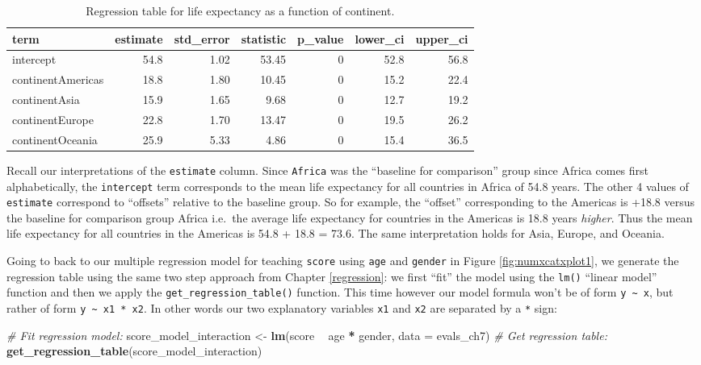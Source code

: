 \documentclass[12pt, krantz2,]{krantz}
\makeatletter
\newenvironment{Shaded}{\begin{snugshade}}{\end{snugshade}}
\newcommand{\CommentTok}[1]{\textcolor[rgb]{0.37,0.37,0.37}{\textit{#1}}}
\newcommand{\DataTypeTok}[1]{\textcolor[rgb]{0.27,0.27,0.27}{#1}}
\newcommand{\KeywordTok}[1]{\textcolor[rgb]{0.27,0.27,0.27}{\textbf{#1}}}
\newcommand{\NormalTok}[1]{#1}
\newcommand{\OperatorTok}[1]{\textcolor[rgb]{0.43,0.43,0.43}{\textbf{#1}}}
\newcommand{\StringTok}[1]{\textcolor[rgb]{0.5,0.5,0.5}{#1}}
\newenvironment{kframe}{%
\medskip{}
\setlength{\fboxsep}{.8em}
 \def\at@end@of@kframe{}%
 \ifinner\ifhmode%
  \def\at@end@of@kframe{\end{minipage}}%
  \begin{minipage}{\columnwidth}%
 \fi\fi%
 \def\FrameCommand##1{\hskip\@totalleftmargin \hskip-\fboxsep
 \colorbox{shadecolor}{##1}\hskip-\fboxsep
     \hskip-\linewidth \hskip-\@totalleftmargin \hskip\columnwidth}%
 \MakeFramed {\advance\hsize-\width
   \@totalleftmargin\z@ \linewidth\hsize
   \@setminipage}}%
 {\par\unskip\endMakeFramed%
 \at@end@of@kframe}
\renewenvironment{Shaded}{\begin{kframe}}{\end{kframe}}
\makeatother
\begin{document}
\begin{table}[H]

\caption{\label{tab:unnamed-chunk-202}Regression table for life expectancy as a function of continent.}
\centering
\fontsize{10}{12}\selectfont
\begin{tabular}{lrrrrrr}
\toprule
term & estimate & std\_error & statistic & p\_value & lower\_ci & upper\_ci\\
\midrule
intercept & 54.8 & 1.02 & 53.45 & 0 & 52.8 & 56.8\\
continentAmericas & 18.8 & 1.80 & 10.45 & 0 & 15.2 & 22.4\\
continentAsia & 15.9 & 1.65 & 9.68 & 0 & 12.7 & 19.2\\
continentEurope & 22.8 & 1.70 & 13.47 & 0 & 19.5 & 26.2\\
continentOceania & 25.9 & 5.33 & 4.86 & 0 & 15.4 & 36.5\\
\bottomrule
\end{tabular}
\end{table}

Recall our interpretations of the \texttt{estimate} column. Since \texttt{Africa} was the ``baseline for comparison'' group since Africa comes first alphabetically, the \texttt{intercept} term corresponds to the mean life expectancy for all countries in Africa of 54.8 years. The other 4 values of \texttt{estimate} correspond to ``offsets'' relative to the baseline group. So for example, the ``offset'' corresponding to the Americas is +18.8 versus the baseline for comparison group Africa i.e.~the average life expectancy for countries in the Americas is 18.8 years \emph{higher}. Thus the mean life expectancy for all countries in the Americas is 54.8 + 18.8 = 73.6. The same interpretation holds for Asia, Europe, and Oceania.

Going to back to our multiple regression model for teaching \texttt{score} using \texttt{age} and \texttt{gender} in Figure \ref{fig:numxcatxplot1}, we generate the regression table using the same two step approach from Chapter \ref{regression}: we first ``fit'' the model using the \texttt{lm()} ``linear model'' function and then we apply the \texttt{get\_regression\_table()} function. This time however our model formula won't be of form \texttt{y\ \textasciitilde{}\ x}, but rather of form \texttt{y\ \textasciitilde{}\ x1\ *\ x2}. In other words our two explanatory variables \texttt{x1} and \texttt{x2} are separated by a \texttt{*} sign:

\begin{Shaded}
\begin{Highlighting}[]
\CommentTok{# Fit regression model:}
\NormalTok{score_model_interaction <-}\StringTok{ }\KeywordTok{lm}\NormalTok{(score }\OperatorTok{~}\StringTok{ }\NormalTok{age }\OperatorTok{*}\StringTok{ }\NormalTok{gender, }\DataTypeTok{data =}\NormalTok{ evals_ch7)}
\CommentTok{# Get regression table:}
\KeywordTok{get_regression_table}\NormalTok{(score_model_interaction)}
\end{Highlighting}
\end{Shaded}
\end{document}
